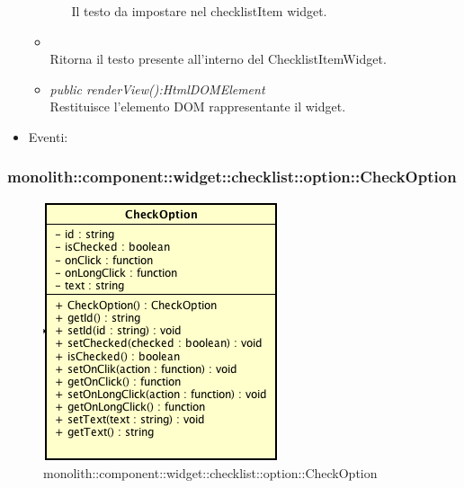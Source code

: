 \begin{itemize}
\begin{itemize}
\begin{itemize}
		Il testo da impostare nel checklistItem widget.
		\end{itemize}
	\item {}\\
	Ritorna il testo presente all'interno del ChecklistItemWidget.
	\item \textit{public renderView():HtmlDOMElement}\\
	Restituisce l'elemento DOM rappresentante il widget.
	\end{itemize}
\item{Eventi}:
\end{itemize}

\subsubsection{monolith::component::widget::checklist::option::CheckOption}

\label{monolith::component::widget::checklist::option::CheckOption}
\begin{figure}[H]
	\centering
	\includegraphics[scale=0.5]{Sezioni/SottosezioniST/img/CheckOption.png}
	\caption{monolith::component::widget::checklist::option::CheckOption}
\end{figure}

